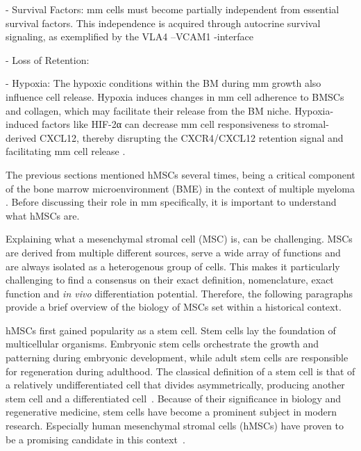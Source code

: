 - Survival Factors:
\ac{mm} cells must become partially independent from
essential survival factors. This independence is acquired through autocrine
survival signaling, as exemplified by the VLA4 –VCAM1 -interface



- Loss of Retention:




- Hypoxia:
The hypoxic conditions within the BM during \ac{mm} growth also influence cell
release. Hypoxia induces changes in \ac{mm} cell adherence to BMSCs and collagen,
which may facilitate their release from the BM niche. Hypoxia-induced factors
like HIF-2α can decrease \ac{mm} cell responsiveness to stromal-derived CXCL12,
thereby disrupting the CXCR4/CXCL12 retention signal and facilitating \ac{mm} cell
release \cite{zeissigTumourDisseminationMultiple2020}.







%
\label{sec:intro_hMSCs}%
The previous sections mentioned hMSCs several times, being a critical component
of the bone marrow microenvironment (BME) in the context of multiple myeloma
\cite{mangoliniBoneMarrowStromal2020}. Before discussing their role in \ac{mm}
specifically, it is important to understand what hMSCs are.

Explaining what a mesenchymal stromal cell (MSC) is, can be challenging. MSCs
are derived from multiple different sources, serve a wide array of functions and
are always isolated as a heterogenous group of cells. This makes it particularly
challenging to find a consensus on their exact definition, nomenclature, exact
function and \textit{in vivo} differentiation potential. Therefore, the
following paragraphs provide a brief overview of the biology of MSCs set within
a historical context.

hMSCs first gained popularity as a stem cell. Stem cells lay the foundation of
multicellular organisms. Embryonic stem cells orchestrate the growth and
patterning during embryonic development, while adult stem cells are responsible
for regeneration during adulthood. The classical definition of a stem cell is
that of a relatively undifferentiated cell that divides asymmetrically,
producing another stem cell and a differentiated
cell~\cite{cooperCellMolecularApproach2000, shenghuiMechanismsStemCell2009}.
Because of their significance in biology and regenerative medicine, stem cells
have become a prominent subject in modern research. Especially human mesenchymal
stromal cells (hMSCs) have proven to be a promising candidate in this
context~\cite{ullahHumanMesenchymalStem2015}.


